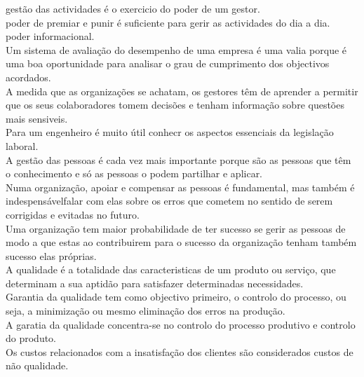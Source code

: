 gestão das actividades é o exercicio do poder de um gestor.\\

poder de premiar e punir é suficiente para gerir as actividades do dia a dia.\\

poder informacional.\\

Um sistema de avaliação do desempenho de uma empresa é uma valia porque é uma boa oportunidade para analisar o grau de cumprimento dos objectivos acordados.\\

A medida que as organizações se achatam, os gestores têm de aprender a permitir que os seus colaboradores tomem decisões e tenham informação sobre questões mais sensiveis.\\

Para um engenheiro é muito útil conhecr os aspectos essenciais da legislação laboral.\\

A gestão das pessoas é cada vez mais importante porque são as pessoas que têm o conhecimento e só as pessoas o podem partilhar e aplicar.\\

Numa organização, apoiar e compensar as pessoas é fundamental, mas também é indespensávelfalar com elas sobre os erros que cometem no sentido de serem corrigidas e evitadas no futuro.\\

Uma organização tem maior probabilidade de ter sucesso se gerir as pessoas de modo a que estas ao contribuirem para o sucesso da organização tenham também sucesso elas próprias.\\

A qualidade é a totalidade das caracteristicas de um produto ou serviço, que determinam a sua aptidão para satisfazer determinadas necessidades.\\

Garantia da qualidade tem como objectivo primeiro, o controlo do processo, ou seja, a minimização ou mesmo eliminação dos erros na produção.\\

A garatia da qualidade concentra-se no controlo do processo produtivo e controlo do produto.\\

Os custos relacionados com a insatisfação dos clientes são considerados custos de não qualidade.\\

